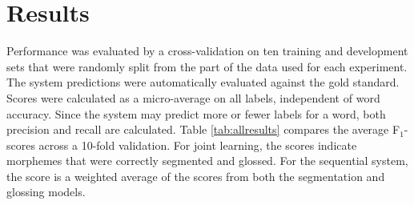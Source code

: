 



\section{Results}
\label{sec:results}

Performance was evaluated by a cross-validation on ten training and development sets that were randomly split from the part of the data used for each experiment.
The system predictions were automatically evaluated against the gold standard. Scores were calculated as a micro-average on all labels, independent of word accuracy. Since the system may predict more or fewer labels for a word, both precision and recall are calculated. Table \ref{tab:allresults} compares the average F$_1$-scores across a 10-fold validation. 
For joint learning, the scores indicate morphemes that were correctly segmented and glossed. For the sequential system, the score is a weighted average of the scores from both the segmentation and glossing models. 

